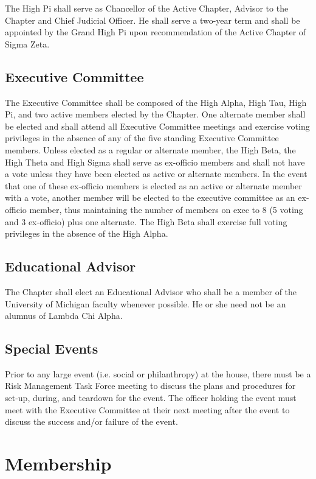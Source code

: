 \documentclass{article}
\begin{document}
The High Pi shall serve as Chancellor of the Active Chapter, Advisor to the
Chapter and Chief Judicial Officer. He shall serve a two-year term and shall be
appointed by the Grand High Pi upon recommendation of the Active Chapter of
Sigma Zeta.

\subsection{Executive Committee}

The Executive Committee shall be composed of the High Alpha, High Tau, High Pi,
and two active members elected by the Chapter. One alternate member shall be
elected and shall attend all Executive Committee meetings and exercise voting
privileges in the absence of any of the five standing Executive Committee
members. Unless elected as a regular or alternate member, the High Beta, the
High Theta and High Sigma shall serve as ex-officio members and shall not have a
vote unless they have been elected as active or alternate members. In the event
that one of these ex-officio members is elected as an active or alternate member
with a vote, another member will be elected to the executive committee as an
ex-officio member, thus maintaining the number of members on exec to 8 (5 voting
and 3 ex-officio) plus one alternate. The High Beta shall exercise full voting
privileges in the absence of the High Alpha.

\subsection{Educational Advisor}

The Chapter shall elect an Educational Advisor who shall be a member of the
University of Michigan faculty whenever possible. He or she need not be an
alumnus of Lambda Chi Alpha.

\subsection{Special Events}

Prior to any large event (i.e. social or philanthropy) at the house, there must
be a Risk Management Task Force meeting to discuss the plans and procedures for
set-up, during, and teardown for the event. The officer holding the event must
meet with the Executive Committee at their next meeting after the event to
discuss the success and/or failure of the event.

\section{Membership}
\end{document}
